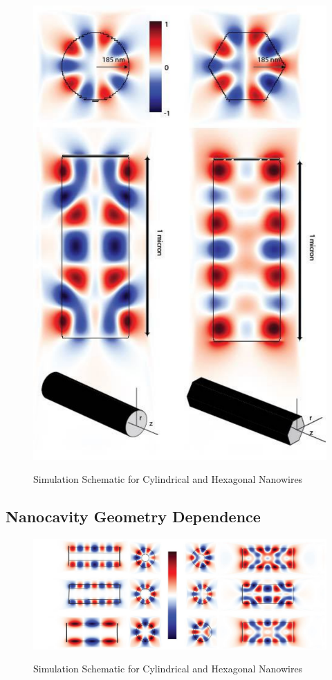 \begin{figure}
  \caption{Simulation Schematic for Cylindrical and Hexagonal Nanowires}
  \centering
  \includegraphics[width=\textwidth]{pictures/LM/NWsketch}
  \label{NWsketch}
\end{figure}

\subsection{Nanocavity Geometry Dependence}


\begin{figure}
  \caption{Simulation Schematic for Cylindrical and Hexagonal Nanowires}
  \centering
  \includegraphics[width=\textwidth]{pictures/LM/CylinRP}
  \label{CylinRP}
\end{figure}

